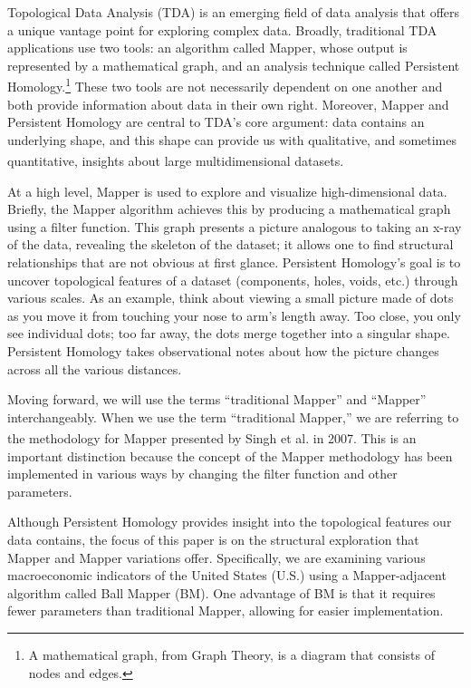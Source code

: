 \documentclass[10pt, letterpaper]{article}
\begin{document}
Topological Data Analysis (TDA) is an emerging field of data analysis
that offers a unique vantage point for exploring complex data. Broadly,
traditional TDA applications use two tools: an algorithm called Mapper,
whose output is represented by a mathematical graph, and an analysis
technique called Persistent
Homology.\textsuperscript{}\footnote{A mathematical graph, from Graph Theory, is a diagram that consists of nodes and edges.}
These two tools are not necessarily dependent on one another and both
provide information about data in their own right. Moreover, Mapper and
Persistent Homology are central to TDA's core argument: data contains an
underlying shape, and this shape can provide us with qualitative, and
sometimes quantitative, insights about large multidimensional
datasets.\textsuperscript{}

At a high level, Mapper is used to explore and visualize
high-dimensional data. Briefly, the Mapper algorithm achieves this by
producing a mathematical graph using a filter function. This graph
presents a picture analogous to taking an x-ray of the data, revealing
the skeleton of the dataset; it allows one to find structural
relationships that are not obvious at first glance. Persistent
Homology's goal is to uncover topological features of a dataset
(components, holes, voids, etc.) through various scales. As an example,
think about viewing a small picture made of dots as you move it from
touching your nose to arm's length away. Too close, you only see
individual dots; too far away, the dots merge together into a singular
shape. Persistent Homology takes observational notes about how the
picture changes across all the various distances.

Moving forward, we will use the terms ``traditional Mapper'' and
``Mapper'' interchangeably. When we use the term ``traditional Mapper,''
we are referring to the methodology for Mapper presented by Singh et
al.\textsuperscript{} in
2007. This is an important distinction because the concept of the Mapper
methodology has been implemented in various ways by changing the filter
function and other parameters.

Although Persistent Homology provides insight into the topological
features our data contains, the focus of this paper is on the structural
exploration that Mapper and Mapper variations offer. Specifically, we
are examining various macroeconomic indicators of the United States
(U.S.) using a Mapper-adjacent algorithm called Ball Mapper (BM). One
advantage of BM is that it requires fewer parameters than traditional
Mapper, allowing for easier implementation.
\end{document}
